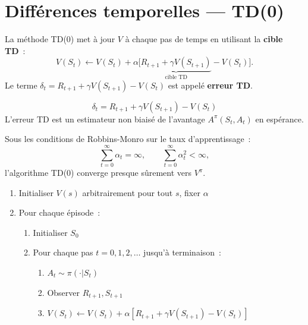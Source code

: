 \section{Diff\'erences temporelles --- TD(0)}

\begin{definition}
La m\'ethode TD(0) met \`a jour $V$ \`a chaque pas de temps en utilisant la
\textbf{cible TD}~:
\[
    V(S_t) \leftarrow V(S_t) + \alpha \big[ \underbrace{R_{t+1} + \gamma V(S_{t+1})}_{\text{cible TD}} - V(S_t) \big].
\]
Le terme $\delta_t = R_{t+1} + \gamma V(S_{t+1}) - V(S_t)$ est appel\'e
\textbf{erreur TD}.
\end{definition}

\begin{formules}[title=\textbf{Erreur de diff\'erence temporelle}]
\[
    \delta_t = R_{t+1} + \gamma V(S_{t+1}) - V(S_t)
\]
L'erreur TD est un estimateur non biais\'e de l'avantage $A^\pi(S_t, A_t)$ en
esp\'erance.
\end{formules}

\begin{theoreme}[Convergence de TD(0)]
Sous les conditions de Robbins-Monro sur le taux d'apprentissage~:
\[
    \sum_{t=0}^{\infty} \alpha_t = \infty, \qquad
    \sum_{t=0}^{\infty} \alpha_t^2 < \infty,
\]
l'algorithme TD(0) converge presque s\^urement vers $V^\pi$.
\end{theoreme}

\begin{algorithme}[title=\textbf{TD(0) pour l'\'evaluation de politique}]
\begin{enumerate}
    \item Initialiser $V(s)$ arbitrairement pour tout $s$, fixer $\alpha$
    \item Pour chaque \'episode~:
    \begin{enumerate}
        \item Initialiser $S_0$
        \item Pour chaque pas $t = 0, 1, 2, \ldots$ jusqu'\`a terminaison~:
        \begin{enumerate}
            \item $A_t \sim \pi(\cdot | S_t)$
            \item Observer $R_{t+1}, S_{t+1}$
            \item $V(S_t) \leftarrow V(S_t) + \alpha[R_{t+1} + \gamma V(S_{t+1}) - V(S_t)]$
        \end{enumerate}
    \end{enumerate}
\end{enumerate}
\end{algorithme}

